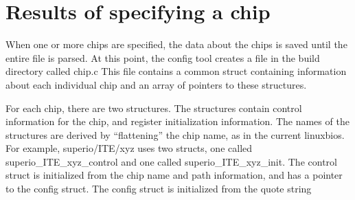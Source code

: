 \section{Results of specifying a chip}

When one or more chips are specified, the data about the chips
is saved until the entire file is parsed. At this point, the config tool
creates a file in the build directory called chip.c This file contains
a common struct containing information about 
each individual chip and an array of pointers to these structures. 

For each chip, there are two structures. The structures contain control 
information for the chip, and register initialization information. The 
names of the structures are derived by ``flattening'' the chip name, 
as in the current linuxbios. For example, superio/ITE/xyz uses 
two structs, one called superio_ITE_xyz_control and one called
superio_ITE_xyz_init. The control struct is initialized from the 
chip name and path information, and has a pointer to the 
config struct. The config struct is initialized from the quote string


